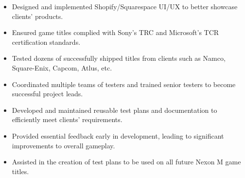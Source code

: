 \documentclass{htresume}
\begin{document}
\begin{minipage}[t]{0.4\textwidth}
\vspace{-\baselineskip}
\end{minipage}
\begin{minipage}[t]{0.25\textwidth}
\vspace{-\baselineskip}
\end{minipage}
\begin{minipage}[t]{0.35\textwidth}
\vspace{-\baselineskip}
\end{minipage}
\vspace{6pt}


\begin{itemize}[noitemsep]
  \item Designed and implemented Shopify/Squarespace UI/UX to better showcase clients' products.
  \item Ensured game titles complied with Sony's TRC and Microsoft's TCR certification standards.
\end{itemize}
\begin{itemize}[noitemsep]
  \item Tested dozens of successfully shipped titles from clients such as Namco, Square-Enix, Capcom, Atlus, etc.
  \item Coordinated multiple teams of testers and trained senior testers to become successful project leads.
  \item Developed and maintained reusable test plans and documentation to efficiently meet clients' requirements.
\end{itemize}
\begin{itemize}[noitemsep]
  \item Provided essential feedback early in development, leading to significant improvements to overall gameplay.
  \item Assisted in the creation of test plans to be used on all future Nexon M game titles.
\end{itemize}
\end{document}
